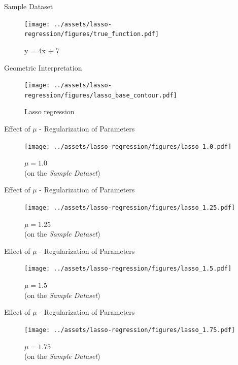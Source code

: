 \documentclass{beamer}
\begin{document}
\begin{frame}{Sample Dataset}

\begin{figure}
    \centering
    \texttt{[image: ../assets/lasso-regression/figures/true\_function.pdf]}
    \caption{y = 4x + 7}
    \label{fig:my_label}
\end{figure}{}

\end{frame}

\begin{frame}{Geometric Interpretation}
\begin{figure}
    \centering
    \texttt{[image: ../assets/lasso-regression/figures/lasso\_base\_contour.pdf]}
    \caption{Lasso regression}
    \label{fig:my_label}
\end{figure}

\end{frame}

\begin{frame}{Effect of $\mu$ - Regularization of Parameters}
\vspace{0.4cm}
\begin{figure}

\texttt{[image: ../assets/lasso-regression/figures/lasso\_1.0.pdf]}
\caption{$\mu = 1.0$\\(on the \emph{Sample Dataset})}
\end{figure}
\end{frame}

\begin{frame}{Effect of $\mu$ - Regularization of Parameters}
\vspace{0.4cm}
\begin{figure}\texttt{[image: ../assets/lasso-regression/figures/lasso\_1.25.pdf]}\caption{$\mu = 1.25$\\(on the \emph{Sample Dataset})}
\end{figure}
\end{frame}

\begin{frame}{Effect of $\mu$ - Regularization of Parameters}
\vspace{0.4cm}
\begin{figure}\texttt{[image: ../assets/lasso-regression/figures/lasso\_1.5.pdf]}\caption{$\mu = 1.5$\\(on the \emph{Sample Dataset})}
\end{figure}
\end{frame}

\begin{frame}{Effect of $\mu$ - Regularization of Parameters}
\vspace{0.4cm}
\begin{figure}\texttt{[image: ../assets/lasso-regression/figures/lasso\_1.75.pdf]}\caption{$\mu = 1.75$\\(on the \emph{Sample Dataset})}
\end{figure}
\end{frame}
\end{document}
